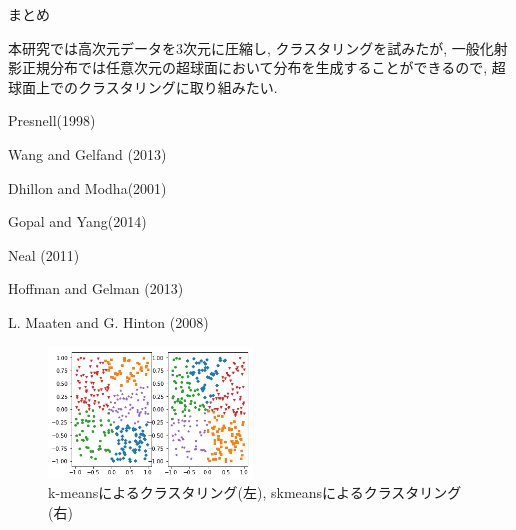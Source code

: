\documentclass[a4j,11pt]{jarticle}
\makeatletter
\def\section{\@startsection{section}{1}{\z@}
   {0.8\Cvs \@plus.5\Cdp \@minus.2\Cdp}
   {0.2\Cvs \@plus.3\Cdp}
   {\normalfont \Large \bfseries}}
\makeatother
\begin{document}
\vspace{-1zh}
\section{まとめ}

本研究では高次元データを$3$次元に圧縮し, クラスタリングを試みたが, 一般化射影正規分布では任意次元の超球面において分布を生成することができるので, 超球面上でのクラスタリングに取り組みたい.






Presnell(1998) \citet{PML}

Wang and Gelfand (2013) \citet{PN1}


Dhillon and Modha(2001) \citet{SKMcluster}

Gopal and Yang(2014) \citet{Gopal}

Neal (2011) \citet{HMC}

Hoffman and Gelman (2013) \citet{NUTS}

L. Maaten and G. Hinton (2008) \citet{tSNE}
\fi

\vspace{-0.3cm}
\begin{figure}[H]
\begin{center}
\includegraphics[clip,height= 35mm]{data/kmeans+skmeans.png}
\end{center}
 \vspace{-0.9cm}
\caption{k-meansによるクラスタリング(左), skmeansによるクラスタリング(右)}
\label{skmeans}
\end{figure}
\end{document}
